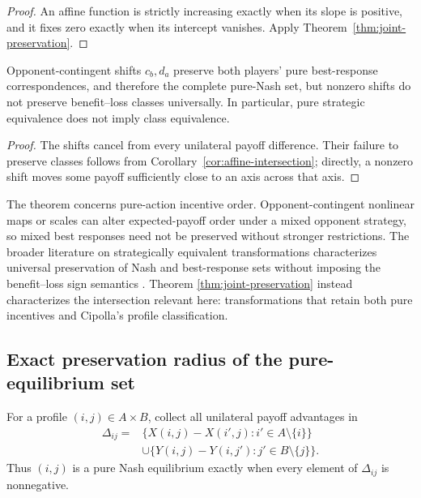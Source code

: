 \begin{proof}
An affine function is strictly increasing exactly when its slope is positive,
and it fixes zero exactly when its intercept vanishes. Apply
Theorem~\ref{thm:joint-preservation}.
\end{proof}

\begin{corollary}
\label{cor:offset-separation}
Opponent-contingent shifts $c_b,d_a$ preserve both players' pure
best-response correspondences, and therefore the complete pure-Nash set, but
nonzero shifts do not preserve benefit--loss classes universally.  In
particular, pure strategic equivalence does not imply class equivalence.
\end{corollary}

\begin{proof}
The shifts cancel from every unilateral payoff difference. Their failure to
preserve classes follows from Corollary~\ref{cor:affine-intersection}; directly,
a nonzero shift moves some payoff sufficiently close to an axis across that
axis.
\end{proof}

The theorem concerns pure-action incentive order. Opponent-contingent nonlinear
maps or scales can alter expected-payoff order under a mixed opponent strategy,
so mixed best responses need not be preserved without stronger restrictions. The broader
literature on strategically equivalent transformations characterizes
universal preservation of Nash and best-response sets without imposing the
benefit--loss sign semantics \citep{TewoldeConitzer2024}.  Theorem
\ref{thm:joint-preservation} instead characterizes the intersection relevant
here: transformations that retain both pure incentives and Cipolla's profile
classification.

\subsection{Exact preservation radius of the pure-equilibrium set}

For a profile $(i,j)\in A\times B$, collect all unilateral payoff advantages in
\[
\begin{aligned}
\Delta_{ij}={}&
\{X(i,j)-X(i',j):i'\in A\setminus\{i\}\}\\
&\cup
\{Y(i,j)-Y(i,j'):j'\in B\setminus\{j\}\}.
\end{aligned}
\]
Thus $(i,j)$ is a pure Nash equilibrium exactly when every element of $\Delta_{ij}$ is nonnegative.

